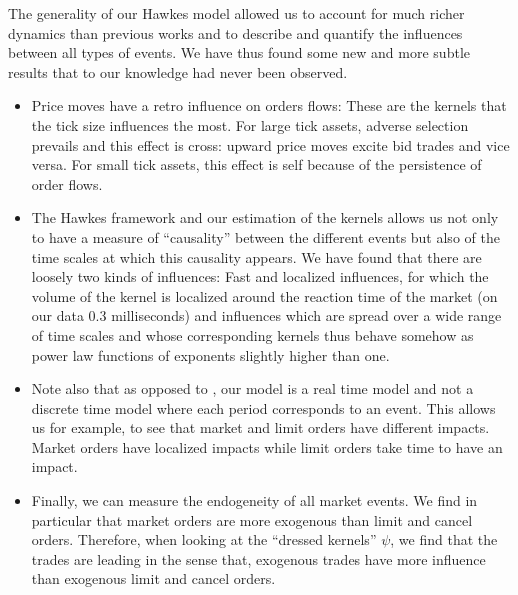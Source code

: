 \documentclass[a4paper,11pt]{article}
\begin{document}
\noindent The generality of our Hawkes model allowed us to account for much richer dynamics than previous works and to describe and quantify the influences between all types of events. We have thus found some new and more subtle results that to our knowledge had never been observed.
\begin{itemize}

\item{Price moves have a retro influence on orders flows: These are the kernels that the tick size influences the most. For large tick assets, adverse selection prevails and this effect is cross: upward price moves excite bid trades and vice versa. For small tick assets, this effect is self because of the persistence of order flows.}


\item{The Hawkes framework and our estimation of the kernels allows us not only to have a measure of ``causality'' between the different events but also of the time scales at which this causality appears. We have found that there are loosely two kinds of influences: Fast and localized influences, for which the volume of the kernel is localized around the reaction time of the market (on our data 0.3 milliseconds) and influences which are spread over a wide range of time scales and whose corresponding kernels thus behave somehow as power law functions of exponents slightly higher than one. }

\item{Note also that as opposed to \cite{eisler2012price}, our model is a real time model and not a discrete time model where each period corresponds to an event. This allows us for example, to see that market and limit orders have different impacts. Market orders have localized impacts while limit orders take time to have an impact.}


\item{Finally, we can measure the endogeneity of all market events. We find in particular that market orders are more exogenous than limit and cancel orders. Therefore, when looking at the ``dressed kernels'' $\psi$, we find that the trades are leading in the sense that, exogenous trades have more influence than exogenous limit and cancel orders.}

\end{itemize}






\end{document}
